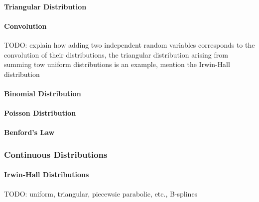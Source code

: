 \paragraph{Triangular Distribution}

\paragraph{Convolution} TODO: explain how adding two independent random variables corresponds to the convolution of their distributions, the triangular distribution arising from summing tow uniform distributions is an example, mention the Irwin-Hall distribution



\paragraph{Binomial Distribution}


\paragraph{Poisson Distribution}


\paragraph{Benford's Law}



\subsubsection{Continuous Distributions}

\paragraph{Irwin-Hall Distributions} TODO: uniform, triangular, piecewsie parabolic, etc., B-splines

